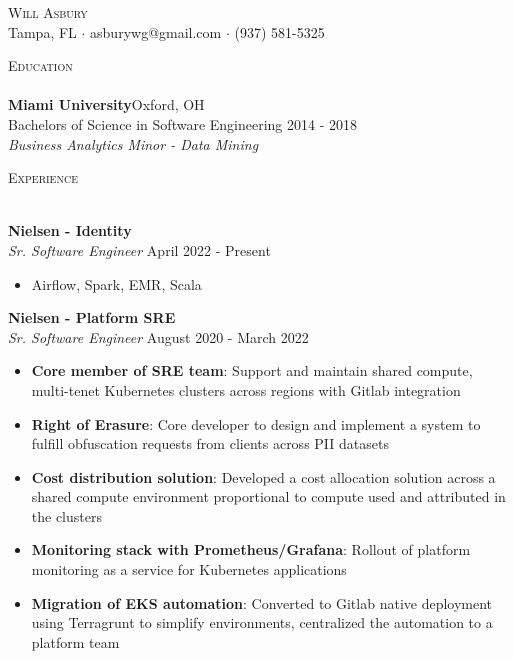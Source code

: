 \documentclass[a4paper]{article}
\newcommand{\lineunder} {
    \vspace*{-8pt} \\
    \hspace*{-18pt} \hrulefill \\
}
\newcommand{\header} [1] {
    {\hspace*{-18pt}\vspace*{6pt} \textsc{#1}}
    \vspace*{-6pt} \lineunder
}
\begin{document}
\vspace*{-40pt}

    

\vspace*{-10pt}
\begin{center}
	{\Huge \scshape {Will Asbury}}\\
	Tampa, FL $\cdot$ asburywg@gmail.com $\cdot$ (937) 581-5325\\
\end{center}

\header{Education}
\textbf{Miami University}\hfill Oxford, OH\\
Bachelors of Science in Software Engineering \hfill 2014 - 2018\\
\textit{Business Analytics Minor - Data Mining}\\
\vspace{3mm}

\header{Experience}
\vspace{1mm}

\textbf{Nielsen - Identity}\\
\textit{Sr. Software Engineer} \hfill April 2022 - Present\\
\vspace{-1mm}
\begin{itemize} \itemsep 1pt
    \item Airflow, Spark, EMR, Scala
\end{itemize}

\textbf{Nielsen - Platform SRE}\\
\textit{Sr. Software Engineer} \hfill August 2020 - March 2022\\
\vspace{-1mm}
\begin{itemize} \itemsep 1pt
    \item \textbf{Core member of SRE team}: Support and maintain shared compute, multi-tenet Kubernetes clusters across regions with Gitlab integration
    \item \textbf{Right of Erasure}: Core developer to design and implement a system to fulfill obfuscation requests from clients across PII datasets
    \item \textbf{Cost distribution solution}: Developed a cost allocation solution across a shared compute environment proportional to compute used and attributed in the clusters
    \item \textbf{Monitoring stack with Prometheus/Grafana}: Rollout of platform monitoring as a service for Kubernetes applications
    \item \textbf{Migration of EKS automation}: Converted to Gitlab native deployment using Terragrunt to simplify environments, centralized the automation to a platform team
\end{itemize}
\end{document}
